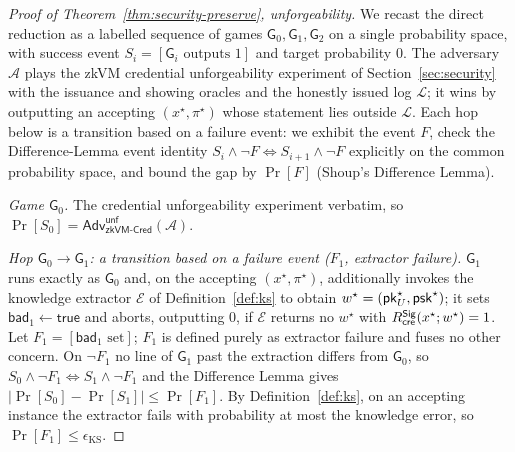 \begin{proof}[Proof of Theorem~\ref{thm:security-preserve}, unforgeability]
We recast the direct reduction as a labelled sequence of games $\mathsf G_0,\mathsf G_1,\mathsf G_2$ on a single probability space, with success event $S_i=[\mathsf G_i\text{ outputs }1]$ and target probability $0$. The adversary $\mathcal A$ plays the zkVM credential unforgeability experiment of Section~\ref{sec:security} with the issuance and showing oracles and the honestly issued log $\mathcal L$; it wins by outputting an accepting $(x^\star,\pi^\star)$ whose statement lies outside $\mathcal L$. Each hop below is a transition based on a failure event: we exhibit the event $F$, check the Difference-Lemma event identity $S_i\wedge\neg F\iff S_{i+1}\wedge\neg F$ explicitly on the common probability space, and bound the gap by $\Pr[F]$ (Shoup's Difference Lemma).

    \smallskip\noindent\emph{Game $\mathsf G_0$.} The credential
unforgeability experiment verbatim, so $\Pr[S_0]=\mathsf{Adv}^{\mathsf{unf}}_{\mathsf{zkVM\text{-}Cred}}(\mathcal A)$.

    \smallskip\noindent\emph{Hop $\mathsf G_0\to\mathsf G_1$: a transition based on
a failure event ($F_1$, extractor failure).} $\mathsf G_1$ runs exactly as $\mathsf G_0$ and, on the accepting $(x^\star,\pi^\star)$, additionally invokes the knowledge extractor $\mathcal E$ of Definition~\ref{def:ks} to obtain $w^\star=(\mathsf{pk}_U^\star,\mathsf{psk}^\star)$; it sets $\mathsf{bad}_1\leftarrow\mathsf{true}$ and aborts, outputting $0$, if $\mathcal E$ returns no $w^\star$ with $R^{\mathsf{Sig}}_{\mathsf{cre}}(x^\star;w^\star)=1$. Let $F_1=[\mathsf{bad}_1\text{ set}]$; $F_1$ is defined purely as extractor failure and fuses no other concern. On $\neg F_1$ no line of $\mathsf G_1$ past the extraction differs from $\mathsf G_0$, so $S_0\wedge\neg F_1\iff S_1\wedge\neg F_1$ and the Difference Lemma gives $|\Pr[S_0]-\Pr[S_1]|\le\Pr[F_1]$. By Definition~\ref{def:ks}, on an accepting instance the extractor fails with probability at most the knowledge error, so $\Pr[F_1]\le\epsilon_{\mathrm{KS}}$.


\end{proof}
